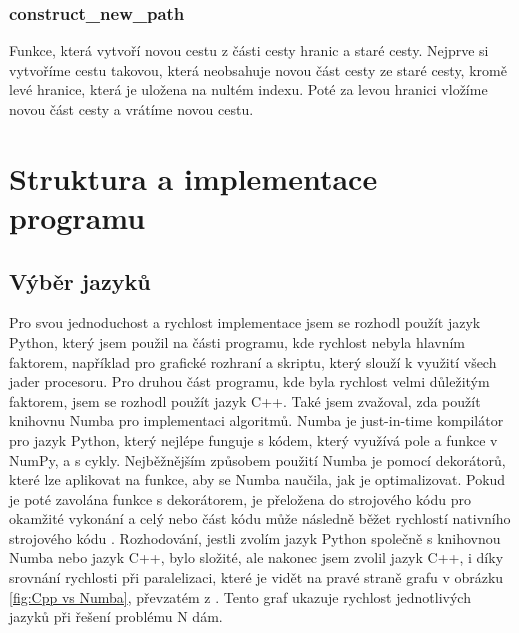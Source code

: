 \subsection{construct\_new\_path}
Funkce, která vytvoří novou cestu z části cesty hranic a staré cesty. Nejprve si vytvoříme cestu takovou, která neobsahuje novou část cesty ze staré cesty, kromě levé hranice, která je uložena na nultém indexu. Poté za levou hranici vložíme novou část cesty a vrátíme novou cestu.


    


\chapter{Struktura a implementace programu}
\section{Výběr jazyků}
Pro svou jednoduchost a rychlost implementace jsem se rozhodl použít jazyk Python, který jsem použil na části programu, kde rychlost nebyla hlavním faktorem, například pro grafické rozhraní a skriptu, který slouží k využití všech jader procesoru. Pro druhou část programu, kde byla rychlost velmi důležitým faktorem, jsem se rozhodl použít jazyk C++. Také jsem zvažoval, zda použít knihovnu Numba pro implementaci algoritmů. Numba je just-in-time kompilátor pro jazyk Python, který nejlépe funguje s kódem, který využívá pole a funkce v NumPy, a s cykly. Nejběžnějším způsobem použití Numba je pomocí dekorátorů, které lze aplikovat na funkce, aby se Numba naučila, jak je optimalizovat. Pokud je poté zavolána funkce s dekorátorem, je přeložena do strojového kódu pro okamžité vykonání a celý nebo část kódu může následně běžet rychlostí nativního strojového kódu \cite{numbaDocs}. Rozhodování, jestli zvolím jazyk Python společně s knihovnou Numba nebo jazyk C++, bylo složité, ale nakonec jsem zvolil jazyk C++, i díky srovnání rychlosti při paralelizaci, které je vidět na pravé straně grafu v obrázku \ref{fig:Cpp vs Numba}, převzatém z \cite{Comparing}. Tento graf ukazuje rychlost jednotlivých jazyků při řešení problému N dám.

